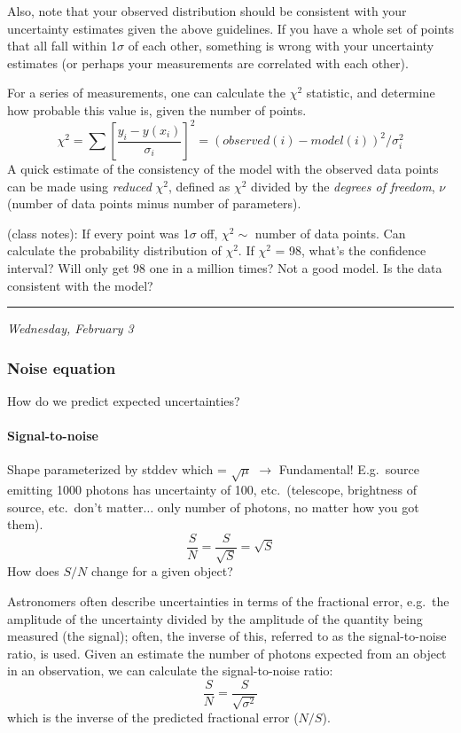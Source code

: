 \documentclass[12pt]{article}
\newcommand{\mynotes}[1]{\textcolor{myBlue}{#1}}
\newcommand{\mydate}[1]{
    \begin{flushright}
        \rule{\textwidth}{0.4pt} %
        \footnotesize\hfill\textit{#1}
    \end{flushright}}
\begin{document}
Also, note that your observed distribution should be consistent with your
uncertainty estimates given the above guidelines. If you have a whole set of
points that all fall within 1$\sigma$ of each other, something is wrong with
your uncertainty estimates (or perhaps your measurements are correlated with
each other).

For a series of measurements, one can calculate the $\chi^{2}$ statistic, and
determine how probable this value is, given the number of points.
\[
    \chi^{2} = \sum \left[ \frac{y_{i} - y(x_{i})}{\sigma_{i}} \right]^{2}
    = (observed(i)-model(i))^{2}/\sigma_i^{2}
    \]
A quick estimate of the consistency of the model with the observed
data points can be made using \textit{reduced} $\chi^{2}$, defined as
$\chi^{2}$ divided by the \textit{degrees of freedom}, $\nu$
(number of data points minus number of parameters).

\mynotes{
(class notes): If every point was 1$\sigma$ off, $\chi^{2} \sim$ number of data
points. Can calculate the probability distribution of $\chi^{2}$. If $\chi^{2}$
= 98, what's the confidence interval? Will only get 98 one in a million times?
Not a good model. Is the data consistent with the model? }

\mydate{Wednesday, February 3}
\subsubsection{Noise equation}
How do we predict expected uncertainties?

\paragraph{Signal-to-noise}
\mynotes{
Shape parameterized by stddev which = $\sqrt{\mu}$
$\rightarrow$ Fundamental! E.g.\ source emitting 1000 photons has
uncertainty of 100, etc.\ (telescope, brightness of source, etc.\ don't
matter$\ldots$ only number of photons, no matter how you got them).
\[
    \frac{S}{N} = \frac{S}{\sqrt{S}} = \sqrt{S}
    \]
How does $S/N$ change for a given object? }

Astronomers often describe uncertainties in terms of the fractional
error, e.g.\ the amplitude of the uncertainty divided by the amplitude
of the quantity being measured (the signal);
often, the inverse of this, referred
to as the signal-to-noise ratio, is used. Given an estimate the number
of photons expected from an object in an observation, we can calculate
the signal-to-noise ratio:
\[
    \frac{S}{N} = \frac{S}{\sqrt{\sigma^{2}}}
    \]
which is the inverse of the predicted fractional error ($N/S$).
\end{document}
